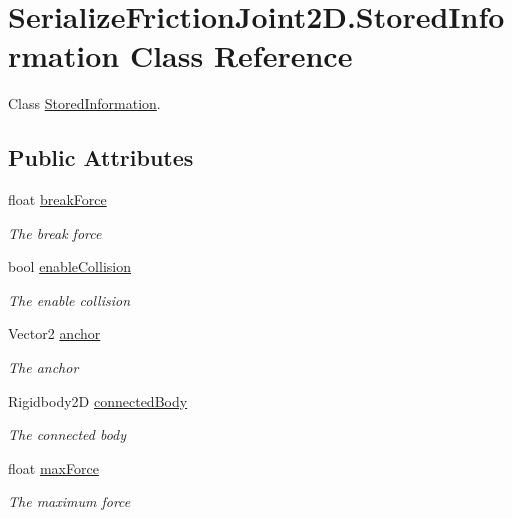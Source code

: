 \hypertarget{class_serialize_friction_joint2_d_1_1_stored_information}{}\section{Serialize\+Friction\+Joint2\+D.\+Stored\+Information Class Reference}
\label{class_serialize_friction_joint2_d_1_1_stored_information}


Class \hyperlink{class_serialize_friction_joint2_d_1_1_stored_information}{Stored\+Information}.  


\subsection*{Public Attributes}
\begin{DoxyCompactItemize}
\item 
float \hyperlink{class_serialize_friction_joint2_d_1_1_stored_information_aba70a1c821f52601eaafc21e0ae6b674}{break\+Force}
\begin{DoxyCompactList}\small\item\em The break force \end{DoxyCompactList}\item 
bool \hyperlink{class_serialize_friction_joint2_d_1_1_stored_information_ad8900f24a11819c9477370375bdfcc40}{enable\+Collision}
\begin{DoxyCompactList}\small\item\em The enable collision \end{DoxyCompactList}\item 
Vector2 \hyperlink{class_serialize_friction_joint2_d_1_1_stored_information_aca1a9636f30074869783fd1d9aae6bcb}{anchor}
\begin{DoxyCompactList}\small\item\em The anchor \end{DoxyCompactList}\item 
Rigidbody2D \hyperlink{class_serialize_friction_joint2_d_1_1_stored_information_af141dede638bd1b001399edfed6fa1a4}{connected\+Body}
\begin{DoxyCompactList}\small\item\em The connected body \end{DoxyCompactList}\item 
float \hyperlink{class_serialize_friction_joint2_d_1_1_stored_information_ac621427c3759cb98231c024d4f3559a5}{max\+Force}
\begin{DoxyCompactList}\small\item\em The maximum force \end{DoxyCompactList}\end{DoxyCompactItemize}


